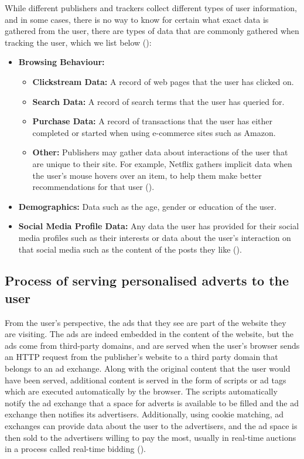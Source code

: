 \documentclass{l4proj}
\begin{document}
While different publishers and trackers collect different types of user information, and in some cases, there is no way to know for certain what exact data is gathered from the user, there are types of data that are commonly gathered when tracking the user, which we list below (\cite{addata}):
\begin{itemize}
   \item 
   \textbf{Browsing Behaviour:}
   \begin{itemize}
	\item
           \textbf{Clickstream Data:} A record of web pages that the user has clicked on.
	\item
           \textbf{Search Data:} A record of search terms that the user has queried for.
	\item
           \textbf{Purchase Data:} A record of transactions that the user has either completed or started when using e-commerce sites such as Amazon.
	\item
           \textbf{Other:} Publishers may gather data about interactions of the user that are unique to their site. For example, Netflix gathers implicit data when the user's mouse hovers over an item, to help them make better recommendations for that user (\cite{netflix}).
   \end{itemize}
   \item
   \textbf{Demographics:} Data such as the age, gender or education of the user.
   \item
   \textbf{Social Media Profile Data:} Any data the user has provided for their social media profiles such as their interests or data about the user's interaction on that social media such as the content of the posts they like (\cite{fbook}).
\end{itemize}

\subsection{Process of serving personalised adverts to the user}
From the user's perspective, the ads that they see are part of the website they are visiting. The ads are indeed embedded in the content of the website, but the ads come from third-party domains, and are served when the user's browser sends an HTTP request from the publisher's website to a third party domain that belongs to an ad exchange. Along with the original content that the user would have been served, additional content is served in the form of scripts or ad tags which are executed automatically by the browser. The scripts automatically notify the ad exchange that a space for adverts is available to be filled and the ad exchange then notifies its advertisers. Additionally, using cookie matching, ad exchanges can provide data about the user to the advertisers, and the ad space is then sold to the advertisers willing to pay the most, usually in real-time auctions in a process called real-time bidding (\cite{Estrada-Jimenez2017}).
\end{document}
